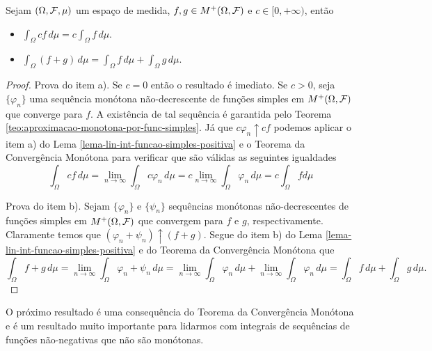 \begin{corolario}
\label{cor-linearidade-int-funcao-mens-positiva}
Sejam $(\Omega,\mathcal{F},\mu)$ um espaço de medida, 
$f,g \in M^+(\Omega,\mathcal{F})$ e $c\in [0,+\infty)$,
então
\begin{itemize}
	\item[a)]
	\(\displaystyle 
		\int_{\Omega} c f\, d\mu
		=
		c\int_{\Omega} f \, d\mu.
	\)
	

	\item[b)]
	\(\displaystyle 
		\int_{\Omega} (f+g)\, d\mu
		=
		\int_{\Omega} f \, d\mu
		+
		\int_{\Omega} g \, d\mu.
	\)

\end{itemize}
\end{corolario}


\begin{proof}
Prova do item a). 
Se $c=0$ então o resultado é imediato.
Se $c>0$, seja $\{\varphi_n\}$ uma sequência 
monótona não-decrescente de funções simples em 
$M^{+}(\Omega,\mathcal{F})$ que converge para $f$.
A existência de tal sequência é garantida 
pelo Teorema \ref{teo:aproximacao-monotona-por-func-simples}.
Já que $c\varphi_n \uparrow cf$ podemos aplicar o item a) do
Lema \ref{lema-lin-int-funcao-simples-positiva} e
o Teorema da Convergência Monótona para verificar que 
são válidas as seguintes igualdades
	\[
	\int_{\Omega} cf\, d\mu
	=
	\lim_{n\to\infty} \int_{\Omega} c\varphi_n\, d\mu
	=
	c\lim_{n\to\infty} \int_{\Omega} \varphi_n\, d\mu	
	=
	c\int_{\Omega} f d\mu		
	\] 



Prova do item b). Sejam 
$\{\varphi_n\}$ e $\{\psi_n\}$ sequências
monótonas não-decrescentes de funções simples em 
$M^{+}(\Omega,\mathcal{F})$ que convergem para $f$ e $g$,
respectivamente. Claramente temos que 
$(\varphi_n+\psi_n) \uparrow (f+g)$.
Segue do item b) do 
Lema \ref{lema-lin-int-funcao-simples-positiva}
e do Teorema da Convergência Monótona que 
	\[
	\int_{\Omega} f+g\, d\mu
	=
	\lim_{n\to\infty} \int_{\Omega} \varphi_n+\psi_n\, d\mu
	=
	\lim_{n\to\infty} \int_{\Omega} \varphi_n\, d\mu
	+		
	\lim_{n\to\infty} \int_{\Omega} \varphi_n\, d\mu	
	=
	\int_{\Omega} f\, d\mu+\int_{\Omega} g\, d\mu.
	\] 
\end{proof}




O próximo resultado é uma consequência do Teorema 
da Convergência Monótona e é um resultado muito 
importante para lidarmos com integrais de sequências
de funções não-negativas que não são monótonas.







